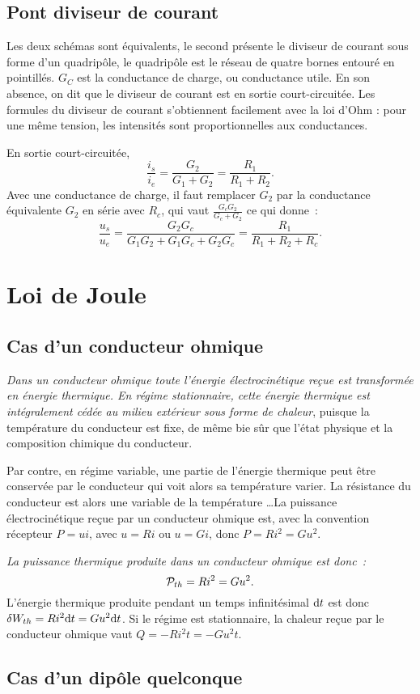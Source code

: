 \subsection{Pont diviseur de courant}
Les deux schémas sont équivalents, le second présente le diviseur de courant sous forme d'un quadripôle, le quadripôle est le réseau de quatre bornes entouré en pointillés. $G_C$ est la conductance de charge, ou conductance utile. En son absence, on dit que le diviseur de courant est en sortie court-circuitée. Les formules du diviseur de courant s'obtiennent facilement avec la loi d'Ohm : pour une même tension, les intensités sont proportionnelles aux conductances.

En sortie court-circuitée,
\begin{equation}\label{eq:pontdiviseuri}
\frac{i_s}{i_e} = \frac{G_2}{G_1+G_2} = \frac{R_1}{R_1+R_2}.
\end{equation}
Avec une conductance de charge, il faut remplacer $G_2$ par la conductance équivalente $G_2$ en série avec $R_c$, qui vaut $\frac{G_cG_2}{G_c+G_2}$ ce qui donne~:
\begin{equation}\label{eq:diviseuri_gc}
\frac{u_s}{u_e} = \frac{G_2G_c}{G_1G_2+G_1G_c+G_2G_c} = \frac{R_1}{R_1+R_2+R_c}.
\end{equation}

\section{Loi de Joule}
\subsection{Cas d'un conducteur ohmique}

\emph{Dans un conducteur ohmique toute l'énergie électrocinétique reçue est transformée en énergie thermique. En régime stationnaire, cette énergie thermique est intégralement cédée au milieu extérieur sous forme de chaleur}, puisque la température du conducteur est fixe, de même bie sûr que l'état physique et la composition chimique du conducteur.

Par contre, en régime variable, une partie de l'énergie thermique peut être conservée par le conducteur qui voit alors sa température varier. La résistance du conducteur est alors une variable de la température \ldots La puissance électrocinétique reçue par un conducteur ohmique est, avec la convention récepteur $P = ui$, avec $u=Ri$ ou $u=Gi$, donc $P=R i^2 = G u^2$.

\emph{La puissance thermique produite dans un conducteur ohmique est donc~:}
\begin{equation}\label{eq:loidejoule}
	\P_{th} = Ri^2=Gu^2.
\end{equation}
L'énergie thermique produite pendant un temps infinitésimal $\D t$ est donc $\delta W_{th} = Ri^2 \D t = Gu^2 \D t$. Si le régime est stationnaire, la chaleur reçue par le conducteur ohmique vaut $Q = -Ri^2 t = -Gu^2 t$.

\subsection{Cas d'un dipôle quelconque}